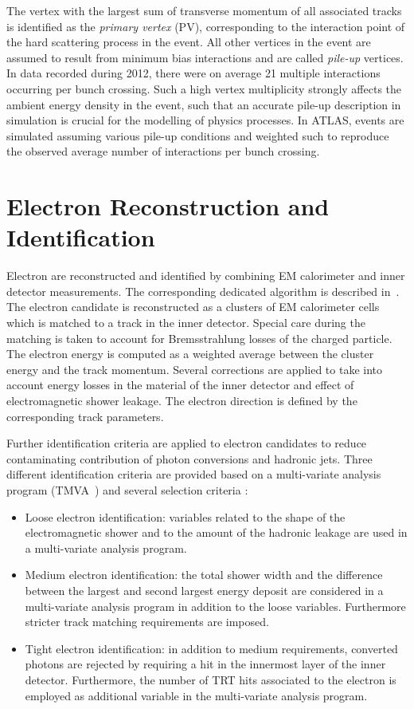 The vertex with the largest sum of transverse momentum of all associated tracks is identified as the \emph{primary vertex} (PV), 
corresponding to  the interaction point of the hard scattering process in the event. All  other vertices in the event
are assumed to result from minimum bias interactions and are called \emph{pile-up} vertices.
In data recorded during 2012, there were on  average  21 multiple interactions  occurring per bunch crossing.
Such a high vertex multiplicity strongly affects the ambient energy density in the event,
such that an accurate pile-up description in simulation is  crucial for the modelling of physics processes. In ATLAS, 
events are simulated assuming various pile-up conditions and weighted such to reproduce  the observed 
average number of interactions per bunch crossing.


\section{Electron Reconstruction and Identification} \label{sec:elec}
Electron are reconstructed and identified by combining EM calorimeter and inner detector measurements.
The corresponding dedicated  algorithm is described in~\cite{electronAlgo}.
The electron candidate is reconstructed as a  clusters of EM calorimeter cells which is matched to a track
in the inner detector. Special care during the matching is taken to account for 
Bremsstrahlung losses of the charged particle.
The electron energy is computed as 
a weighted average between the cluster energy and the track momentum. Several corrections are applied to
take into account energy losses in the material of the inner detector and effect of electromagnetic shower 
leakage. The electron direction is defined by the corresponding track parameters. 

Further identification criteria are applied to electron candidates to reduce contaminating contribution of 
photon conversions and hadronic jets. Three different identification criteria are provided based on a multi-variate
analysis program (TMVA~\cite{TMVA}) and several selection criteria :
\begin{itemize}
	\item Loose electron identification: variables related to the shape of the electromagnetic shower and 
	to the amount of the hadronic leakage are used in a multi-variate analysis program.
	\item Medium electron identification: the total shower width and the difference between the largest and second largest 
	energy deposit are considered in a multi-variate analysis program in addition to the loose variables. Furthermore  stricter 
	track matching requirements are imposed.
	\item Tight electron identification: in addition to medium requirements, 
		converted photons are rejected by requiring a hit in the innermost layer of the inner detector. 
		Furthermore, the number of TRT hits associated to the electron is employed as additional variable 
		in the multi-variate analysis program.
\end{itemize}

